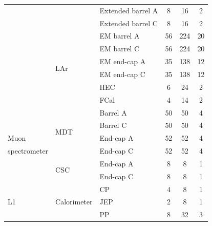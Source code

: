 \begin {table}[h!]
\begin{center}
\begin{tabular}{ | l | l | l | c | c | c | }
									& 							& Extended barrel A & 8 		& 16 		& 2 		\\%
									&							& Extended barrel C & 8 		& 16 		& 2 		\\%
									\cline{2-6}
									& \multirow{6}{*}{LAr}		& EM barrel A 		& 56 		& 224 		& 20 		\\%
									& 							& EM barrel C 		& 56 		& 224 		& 20 		\\%
									& 							& EM end-cap A 		& 35 		& 138 		& 12 		\\%
									& 							& EM end-cap C 		& 35  		& 138 		& 12 		\\%
									&							& HEC 				& 6 		& 24 		& 2 		\\%
									& 							& FCal 				& 4 		& 14 		& 2 		\\%
		\hline
									& \multirow{4}{*}{MDT}		& Barrel A 			& 50 		& 50 		& 4 		\\%
									& 							& Barrel C 			& 50 		& 50 		& 4 		\\%
Muon								& 							& End-cap A 		& 52 		& 52 		& 4  		\\%
spectrometer						& 							& End-cap C 		& 52 		& 52 		& 4 		\\%
									\cline{2-6}
									& \multirow{2}{*}{CSC} 		& End-cap A 		& 8 		& 8 		& 1 		\\%
									&							& End-cap C 		& 8 		& 8 		& 1 		\\%
		\hline
\multirow{9}{*}{L1}					& \multirow{3}{*}{Calorimeter} & CP				& 4 		& 8 		& 1  		\\%
									& 							& JEP 				& 2 		& 8 		& 1 		\\%
									& 							& PP 				& 8 		& 32 		& 3 		\\%

\end{tabular}
\end{center}
\end{table}
